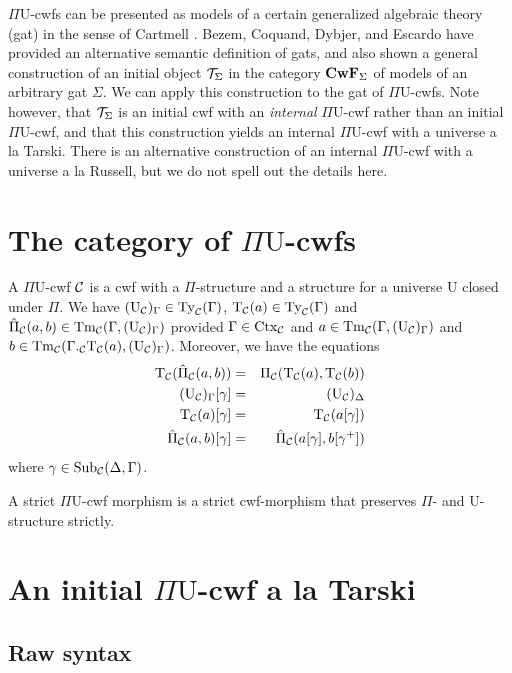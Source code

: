 \documentclass{lmcs}
\def\UU{\mathrm{U}}
\def\Ta{\mathrm{T}}
\def\Pihat{\hat{\Pi}}
\begin{document}
$\Pi\UU$-cwfs can be presented as models of a certain generalized algebraic theory (gat) in the sense of Cartmell \cite{cartmell:phd}. Bezem, Coquand, Dybjer, and Escardo \cite{bezem:hofmann} have provided an alternative semantic definition of gats, and also shown a general construction of an initial object ${\mathcal T}_\Sigma$ in the category $\textbf{CwF}_\Sigma$ of models of an arbitrary gat $\Sigma$. We can apply this construction to the gat of $\Pi\UU$-cwfs. Note however, that ${\mathcal T}_\Sigma$ is an initial cwf with an {\em internal} $\Pi\UU$-cwf rather than an initial $\Pi\UU$-cwf, and that this construction yields an internal $\Pi\UU$-cwf with a universe a la Tarski. There is an alternative construction of an internal $\Pi\UU$-cwf with a universe a la Russell, but we do not spell out the details here.

\section{The category of $\Pi\UU$-cwfs}

 A $\Pi \UU$-cwf ${\mathcal C}$ is a cwf with a $\Pi$-structure and a structure for a universe $\UU$ closed under $\Pi$. We have $(\UU_\C)_\Gamma \in \Ty_\C(\Gamma)$, $\Ta_\C(a) \in \Ty_\C(\Gamma)$ and $\Pihat_\C(a,b) \in \Tm_\C(\Gamma,(\UU_\C)_\Gamma)$ provided $\Gamma \in \mathrm{Ctx}_{\mathcal C}$ and $a  \in \Tm_\C(\Gamma,(\UU_\C)_\Gamma)$ and 
$b \in \Tm_\C(\Gamma ._\C \Ta_\C(a),(\UU_\C)_\Gamma)$. Moreover, we have the equations
\begin{eqnarray*}
\Ta_\C(\Pihat_\C(a,b)) &= &\Pi_\C(\Ta_\C(a),\Ta_\C(b))\\
(\UU_\C)_\Gamma[\gamma] &=&( \UU_\C)_\Delta\\
\Ta_\C(a)[\gamma] &=& \Ta_\C(a[\gamma])\\
\Pihat_\C(a,b)[\gamma] &=& \Pihat_\C(a[\gamma],b[\gamma^+])
\end{eqnarray*}
where $\gamma \in \mathrm{Sub}_{\mathcal C}(\Delta,\Gamma)$.

A strict $\Pi\UU$-cwf morphism is a strict cwf-morphism that preserves $\Pi$- and $\UU$-structure strictly.

\section{An initial $\Pi\UU$-cwf a la Tarski}
\label{sec:syntax}

\subsection{Raw syntax}\label{sec:grammar}
\end{document}
